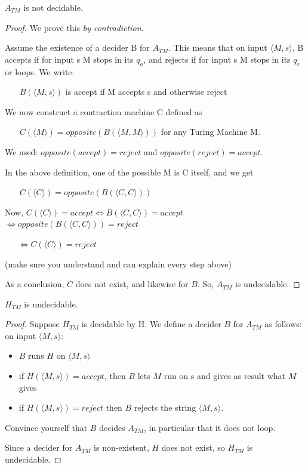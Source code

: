 \begin{theorem}
$A_{TM}$ is not decidable.
\end{theorem}
\begin{proof}
We prove this {\em by contradiction}.


Assume the existence of a decider B for $A_{TM}$. This means that on
input $\langle M,s \rangle$, B accepts if for input s M stops in its
$q_a$, and rejects if for input s M stops in its $q_r$ or loops. We
write:

$~~~~~~~~B(\langle M,s \rangle)$ is accept if M accepts s and otherwise reject

We now construct a contraction machine C defined as

$~~~~~~~~C(\langle M \rangle) = opposite(B(\langle M,M \rangle))$ for
any Turing Machine M.

We used:
$opposite(accept) = reject$ and $opposite(reject) = accept$.


In the above definition, one of the possible M is C itself, and we get


$~~~~~~~~C(\langle C \rangle) = opposite(B(\langle C,C \rangle))$


Now,  $C(\langle C \rangle) = accept \Leftrightarrow B(\langle C,C \rangle)
= accept$
%
$ \Leftrightarrow opposite(B(\langle C,C \rangle)) = reject$

$~~~~~~~ \Leftrightarrow C(\langle C \rangle) = reject$

(make sure you understand and can explain every step above)

As a conclusion, $C$ does not exist, and likewise for $B$. So,
$A_{TM}$ is undecidable.
\end{proof}

\newpage

\begin{theorem}
$H_{TM}$ is undecidable.
\end{theorem}
\begin{proof}
Suppose $H_{TM}$ is decidable by H. We define a decider $B$ for
$A_{TM}$ as follows: on input $\langle M,s \rangle$:
\begin{itemize}
\item $B$ runs $H$ on $\langle M,s \rangle$
\item if $H(\langle M,s \rangle) = accept$, then $B$ lets $M$ run on s
  and gives as result what $M$ gives
\item if $H(\langle M,s \rangle) = reject$ then $B$ rejects the string
  $\langle M,s \rangle$.
\end{itemize}
Convince yourself that $B$ decides $A_{TM}$, in particular that it
does not loop.

Since a decider for $A_{TM}$ is non-existent, $H$ does not exist, so
$H_{TM}$ is undecidable.
\end{proof}

